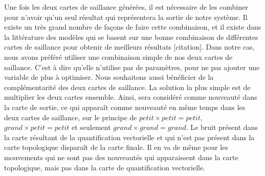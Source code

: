 	Une fois les deux cartes de saillance générées, il est nécessaire de les combiner pour n'avoir qu'un seul résultat qui représentera la sortie de notre système. Il existe un très grand nombre de façons de faire cette combinaison, et il existe dans la littérature des modèles qui se basent sur une bonne combinaison de différentes cartes de saillance pour obtenir de meilleurs résultats [citation]. Dans notre cas, nous avons préféré utiliser une combinaison simple de nos deux cartes de saillance. C'est à dire qu'elle n'utilise pas de paramètres, pour ne pas ajouter une variable de plus à optimiser. Nous souhaitons aussi bénéficier de la complémentarité des deux cartes de saillance. La solution la plus simple est de multiplier les deux cartes ensemble. Ainsi, sera considéré comme nouveauté dans la carte de sortie, ce qui apparaît comme nouveauté en même temps dans les deux cartes de saillance, sur le principe de $\textit{petit} \times \textit{petit} = \textit{petit}$, $\textit{grand} \times \textit{petit} = \textit{petit}$ et seulement $\textit{grand} \times \textit{grand} = \textit{grand}$. Le bruit présent dans la carte résultant de la quantification vectorielle et qui n'est pas présent dans la carte topologique disparaît de la carte finale. Il en va de même pour les mouvements qui ne sont pas des nouveautés qui apparaissent dans la carte topologique, mais pas dans la carte de quantification vectorielle.

